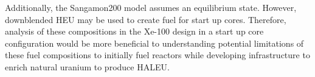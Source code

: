 Additionally, the Sangamon200 model assumes an equilibrium state. 
However, downblended \gls*{HEU} may be used to create fuel for start up 
cores. Therefore, analysis of these compositions in the Xe-100 
design in a start up core configuration would be more beneficial to 
understanding potential limitations of these fuel compositions 
to initially fuel reactors while developing infrastructure to 
enrich natural uranium to produce \gls*{HALEU}. 